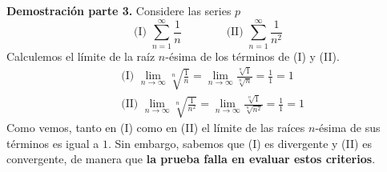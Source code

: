\documentclass[12pt]{article}
\begin{document}
\textbf{Demostración parte 3.} Considere las series $p$
\[
  \text{(I) } \sum_{n = 1}^{\infty} \frac{1}{n} \qquad \qquad \text{(II) } \sum_{n = 1}^{\infty} \frac{1}{n^{2}}
\]
Calculemos el límite de la raíz $n$-ésima de los términos de (I) y (II).
\begin{align*}
&\text{(I) } \lim_{n \to \infty} \sqrt[n]{\frac{1}{n}} = \lim_{n \to \infty} \frac{\sqrt[n]{1}}{\sqrt[n]{n}}
                                                       = \frac{1}{1}
                                                       = 1 \\
&\text{(II) } \lim_{n \to \infty} \sqrt[n]{\frac{1}{n^{2}}} = \lim_{n \to \infty} \frac{\sqrt[n]{1}}{\sqrt[n]{n^{2}}}
                                                       = \frac{1}{1}
                                                       = 1
\end{align*}
Como vemos, tanto en (I) como en (II) el límite de las raíces $n$-ésima de sus términos es igual a $1$. Sin embargo, sabemos que (I) es divergente y (II) es convergente, de manera que \textbf{la prueba falla en evaluar estos criterios}.
\end{document}
